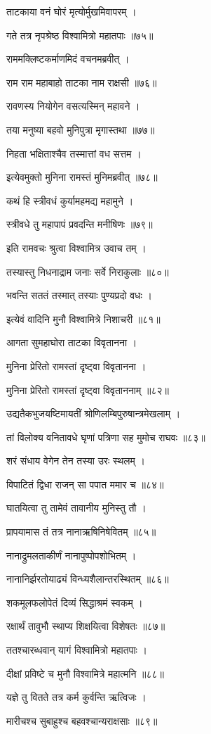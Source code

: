 ताटकाया वनं घोरं मृत्योर्मुखमिवापरम् ।

गते तत्र नृपश्रेष्ठ विश्वामित्रो महातपाः ॥७५॥

राममक्लिष्टकर्माणमिदं वचनमब्रवीत् ।

राम राम महाबाहो ताटका नाम राक्षसी ॥७६॥

रावणस्य नियोगेन वसत्यस्मिन् महावने ।

तया मनुष्या बहवो मुनिपुत्रा मृगास्तथा ॥७७॥

निहता भक्षिताश्चैव तस्मात्तां वध सत्तम ।

इत्येवमुक्तो मुनिना रामस्तं मुनिमब्रवीत् ॥७८॥

कथं हि स्त्रीवधं कुर्यामहमद्य महामुने ।

स्त्रीवधे तु महापापं प्रवदन्ति मनीषिणः ॥७९॥

इति रामवचः श्रुत्वा विश्वामित्र उवाच तम् ।

तस्यास्तु निधनाद्राम जनाः सर्वे निराकुलाः ॥८०॥

भवन्ति सततं तस्मात् तस्याः पुण्यप्रदो वधः ।

इत्येवं वादिनि मुनौ विश्वामित्रे निशाचरी ॥८१॥

आगता सुमहाघोरा ताटका विवृतानना ।

मुनिना प्रेरितो रामस्तां दृष्ट्वा विवृतानना ।

मुनिना प्रेरितो रामस्तां दृष्ट्वा विवृताननाम् ॥८२॥

उद्यतैकभुजयष्टिमायतीं श्रोणिलम्बिपुरुषान्त्रमेखलाम् ।

तां विलोक्य वनितावधे घृणां पत्रिणा सह मुमोच राघवः ॥८३॥

शरं संधाय वेगेन तेन तस्या उरः स्थलम् ।

विपाटितं द्विधा राजन् सा पपात ममार च ॥८४॥

घातयित्वा तु तामेवं तावानीय मुनिस्तु तौ ।

प्रापयामास तं तत्र नानाऋषिनिषेवितम् ॥८५॥

नानाद्रुमलताकीर्णं नानापुष्पोपशोभितम् ।

नानानिर्झरतोयाढ्यं विन्ध्यशैलान्तरस्थितम् ॥८६॥

शकमूलफलोपेतं दिव्यं सिद्धाश्रमं स्वकम् ।

रक्षार्थं तावुभौ स्थाप्य शिक्षयित्वा विशेषतः ॥८७॥

ततश्चारब्धवान् यागं विश्वामित्रो महातपाः ।

दीक्षां प्रविष्टे च मुनौ विश्वामित्रे महात्मनि ॥८८॥

यज्ञे तु वितते तत्र कर्म कुर्वन्ति ऋत्विजः ।

मारीचश्च सुबाहुश्च बहवश्चान्यराक्षसाः ॥८९॥

